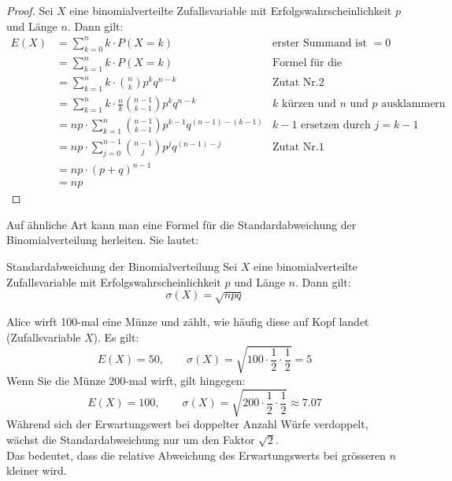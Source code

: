 \begin{proof}
    Sei \(X\) eine binomialverteilte Zufallsvariable mit Erfolgswahrscheinlichkeit \(p\) und Länge \(n\). Dann gilt:
    \begin{align*}
        E(X) & = \sum_{k=0}^n k \cdot P(X=k)                                        & \text{erster Summand ist \(=0\)}                    \\
             & = \sum_{k=1}^{n} k \cdot P(X=k)                                      & \text{Formel für die Binomialverteilung}            \\
             & = \sum_{k=1}^{n} k \cdot \binom{n}{k} p^k q^{n-k}                    & \text{Zutat Nr.2}                                   \\
             & = \sum_{k=1}^{n} k \cdot \frac{n}{k} \binom{n-1}{k-1} p^k q^{n-k}    & \text{\(k\) kürzen und \(n\) und \(p\) ausklammern} \\
             & = np \cdot \sum_{k=1}^{n} \binom{n-1}{k-1} p^{k-1} q^{(n-1) - (k-1)} & \text{\(k-1\) ersetzen durch \(j = k-1\)}           \\
             & = np \cdot \sum_{j=0}^{n-1} \binom{n-1}{j} p^j q^{(n-1)-j}           & \text{Zutat Nr.1}                                   \\
             & = np \cdot (p+q)^{n-1}                                               &                                                     \\
             & = np
    \end{align*}


\end{proof}

Auf ähnliche Art kann man eine Formel für die Standardabweichung der Binomialverteilung herleiten. Sie lautet:
\begin{satz}
    {Standardabweichung der Binomialverteilung}{}
    Sei \(X\) eine binomialverteilte Zufallsvariable mit Erfolgswahrscheinlichkeit \(p\) und Länge \(n\). Dann gilt:
    \[
        \sigma(X) = \sqrt{n  p  q}
    \]
\end{satz}

\begin{bsp}
    {}{}
    Alice wirft 100-mal eine Münze und zählt, wie häufig diese auf Kopf landet (Zufallsvariable \(X\)). Es gilt:
    \[E(X) = 50, \qquad \sigma(X) = \sqrt{100 \cdot \frac{1}{2} \cdot \frac{1}{2}} = 5\]
    Wenn Sie die Münze 200-mal wirft, gilt hingegen:
    \[E(X) = 100, \qquad \sigma(X) = \sqrt{200 \cdot \frac{1}{2} \cdot \frac{1}{2}} \approx 7.07\]
    Während sich der Erwartungswert bei doppelter Anzahl Würfe verdoppelt, wächst die Standardabweichung nur um den Faktor \(\sqrt{2}\). \\
    Das bedeutet, dass die relative Abweichung des Erwartungswerts bei grösseren \(n\) kleiner wird.
\end{bsp}

